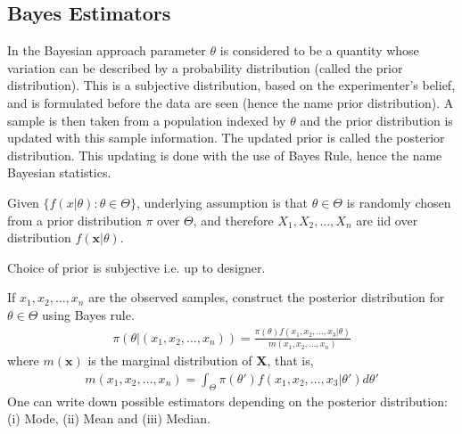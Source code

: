 \subsection{Bayes Estimators}
In the Bayesian approach parameter $\theta$ is considered to be a quantity whose variation can be described by a probability distribution (called the prior distribution). This is a subjective distribution, based on the experimenter's belief, and is formulated before the data are seen (hence the name prior distribution). A sample is then taken from a population indexed by $\theta$ and the prior distribution is updated with this sample information. The updated prior is called the posterior distribution. This updating is done with the use of Bayes Rule, hence the name Bayesian statistics.
\par Given $\{f(x|\theta):\theta \in \Theta\}$, underlying assumption is that $\theta \in \Theta$ is randomly chosen from a prior distribution $\pi$ over $\Theta$, and therefore $X_1,X_2,...,X_n$ are iid over distribution $f(\textbf{x}|\theta)$.
\begin{note}
 Choice of prior is subjective i.e. up to designer.
\end{note}
If $x_1,x_2,\dots,x_n$ are the observed samples, construct the posterior distribution for $\theta \in \Theta$ using Bayes rule.
\begin{align}
\pi(\theta|(x_1,x_2,\dots,x_n))=\frac{\pi(\theta)f(x_1,x_2,\dots,x_3|\theta)}{m(x_1,x_2,\dots,x_n)}
\end{align} 
where $m(\textbf{x})$ is the marginal distribution of $\textbf{X}$, that is,
\begin{align}
m(x_1,x_2,\dots,x_n)=\int_{\Theta}\pi(\theta')f(x_1,x_2,\dots,x_3|\theta')d\theta'
\end{align} 
One can write down possible estimators depending on the posterior distribution: (i) Mode, (ii) Mean and (iii) Median.

